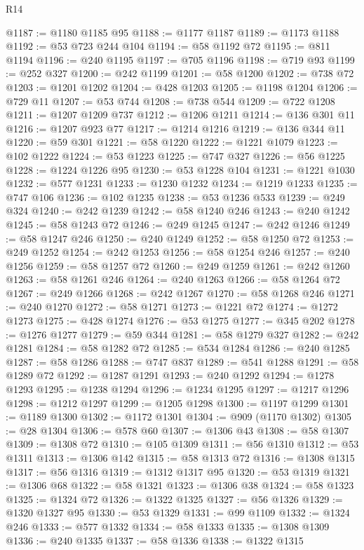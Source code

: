 \begin{lexlean}{R14}
\begin{coremodule}
@1187 := @1180 @1185 @95
@1188 := @1177 @1187
@1189 := @1173 @1188
@1192 := @53 @723 @244 @104
@1194 := @58 @1192 @72
@1195 := @811 @1194
@1196 := @240 @1195
@1197 := @705 @1196
@1198 := @719 @93
@1199 := @252 @327
@1200 := @242 @1199
@1201 := @58 @1200
@1202 := @738 @72
@1203 := @1201 @1202
@1204 := @428 @1203
@1205 := @1198 @1204
@1206 := @729 @11
@1207 := @53 @744
@1208 := @738 @544
@1209 := @722 @1208
@1211 := @1207 @1209 @737
@1212 := @1206 @1211
@1214 := @136 @301 @11
@1216 := @1207 @923 @77
@1217 := @1214 @1216
@1219 := @136 @344 @11
@1220 := @59 @301
@1221 := @58 @1220
@1222 := @1221 @1079
@1223 := @102 @1222
@1224 := @53 @1223
@1225 := @747 @327
@1226 := @56 @1225
@1228 := @1224 @1226 @95
@1230 := @53 @1228 @104
@1231 := @1221 @1030
@1232 := @577 @1231
@1233 := @1230 @1232
@1234 := @1219 @1233
@1235 := @747 @106
@1236 := @102 @1235
@1238 := @53 @1236 @533
@1239 := @249 @324
@1240 := @242 @1239
@1242 := @58 @1240 @246
@1243 := @240 @1242
@1245 := @58 @1243 @72
@1246 := @249 @1245
@1247 := @242 @1246
@1249 := @58 @1247 @246
@1250 := @240 @1249
@1252 := @58 @1250 @72
@1253 := @249 @1252
@1254 := @242 @1253
@1256 := @58 @1254 @246
@1257 := @240 @1256
@1259 := @58 @1257 @72
@1260 := @249 @1259
@1261 := @242 @1260
@1263 := @58 @1261 @246
@1264 := @240 @1263
@1266 := @58 @1264 @72
@1267 := @249 @1266
@1268 := @242 @1267
@1270 := @58 @1268 @246
@1271 := @240 @1270
@1272 := @58 @1271
@1273 := @1221 @72
@1274 := @1272 @1273
@1275 := @428 @1274
@1276 := @53 @1275
@1277 := @345 @202
@1278 := @1276 @1277
@1279 := @59 @344
@1281 := @58 @1279 @327
@1282 := @242 @1281
@1284 := @58 @1282 @72
@1285 := @534 @1284
@1286 := @240 @1285
@1287 := @58 @1286
@1288 := @747 @837
@1289 := @541 @1288
@1291 := @58 @1289 @72
@1292 := @1287 @1291
@1293 := @240 @1292
@1294 := @1278 @1293
@1295 := @1238 @1294
@1296 := @1234 @1295
@1297 := @1217 @1296
@1298 := @1212 @1297
@1299 := @1205 @1298
@1300 := @1197 @1299
@1301 := @1189 @1300
@1302 := @1172 @1301
@1304 := @909 (@1170 @1302)
@1305 := @28 @1304
@1306 := @578 @60
@1307 := @1306 @43
@1308 := @58 @1307
@1309 := @1308 @72
@1310 := @105 @1309
@1311 := @56 @1310
@1312 := @53 @1311
@1313 := @1306 @142
@1315 := @58 @1313 @72
@1316 := @1308 @1315
@1317 := @56 @1316
@1319 := @1312 @1317 @95
@1320 := @53 @1319
@1321 := @1306 @68
@1322 := @58 @1321
@1323 := @1306 @38
@1324 := @58 @1323
@1325 := @1324 @72
@1326 := @1322 @1325
@1327 := @56 @1326
@1329 := @1320 @1327 @95
@1330 := @53 @1329
@1331 := @99 @1109
@1332 := @1324 @246
@1333 := @577 @1332
@1334 := @58 @1333
@1335 := @1308 @1309
@1336 := @240 @1335
@1337 := @58 @1336
@1338 := @1322 @1315

\end{coremodule}
\end{lexlean}
